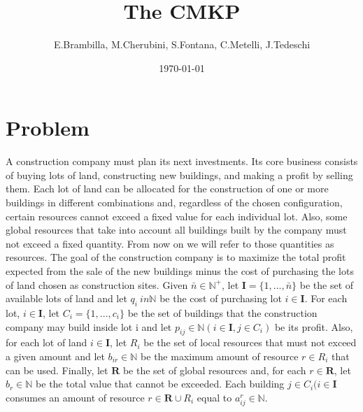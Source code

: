 \documentclass[a4paper, twocolumn, oneside]{article}
\title{The \ac{CMKP}}
\author{E.Brambilla, M.Cherubini, S.Fontana, C.Metelli, J.Tedeschi}
\date{\today}
\begin{document}

\section{Problem}\label{sec:problem}
A construction company must plan its next investments. Its core business consists of buying lots of land, constructing new buildings, and making a profit by selling them. 
Each lot of land can be allocated for the construction of one or more buildings in different combinations and, regardless of the chosen configuration, certain resources cannot exceed a fixed value for each individual lot. 
Also, some global resources that take into account all buildings built by the company must not exceed a fixed quantity. From now on we will refer to those quantities
as resources. 
The goal of the construction company is to maximize the total profit expected from the sale of
the new buildings minus the cost of purchasing the lots of land chosen as construction sites.
Given \(\bar{n} \in \mathbb{N}^+\), let \(\mathbf{I} = \{ 1, ... , \bar{n} \}\) be the set of available lots of land and let \(q_i\ in \mathbb{N}\)  be the cost of purchasing lot \( i \in \mathbf{I}\). 
For each lot, \(i \in \mathbf{I}\), let \(C_i = \{ 1, ... , c_i \}\) be the set of buildings that the construction company may build inside lot i and let \(p_{ij} \in \mathbb{N} (i \in \mathbf{I}, j \in C_i)\) be its profit. 
Also, for each lot of land \(i \in \mathbf{I}\), let \(R_i\) be the set of local resources that must not exceed a given amount and let \(b_{ir} \in \mathbb{N}\) be the maximum amount of resource \(r \in R_i\) that can be used. Finally, let \(\mathbf{R}\) be the set of global resources and, for each \(r \in \mathbf{R} \), let \(b_r \in \mathbb{N} \) be the total value that cannot be exceeded. 
Each building \(j \in C_i (i \in \mathbf{I}\) consumes an amount of resource \(r \in \mathbf{R} \cup R_i\) equal to \(a^r_{ij} \in \mathbb{N}\).
\end{document}
